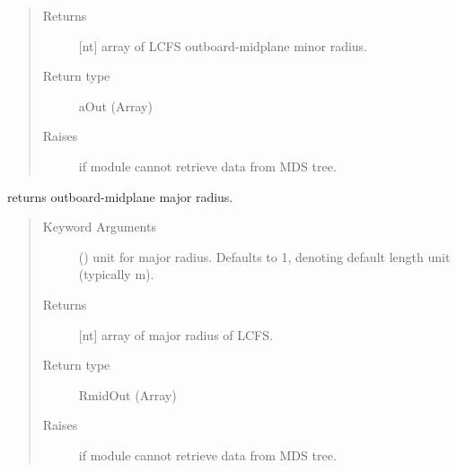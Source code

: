 \documentclass[letterpaper,10pt,english]{sphinxmanual}
\begin{document}
\begin{fulllineitems}
\begin{fulllineitems}
\begin{quote}
\begin{description}
\item[{Returns}] \leavevmode
{[}nt{]} array of LCFS outboard-midplane minor radius.

\item[{Return type}] \leavevmode
aOut (Array)

\item[{Raises}] \leavevmode
{} \textendash{} if module cannot retrieve data from MDS tree.

\end{description}\end{quote}

\end{fulllineitems}


\begin{fulllineitems}
\label{\detokenize{eqtools:eqtools.EFIT.EFITTree.getRmidOut}}
returns outboard-midplane major radius.
\begin{quote}\begin{description}
\item[{Keyword Arguments}] \leavevmode
{} () \textendash{} unit for major radius.  Defaults to 1,
denoting default length unit (typically m).

\item[{Returns}] \leavevmode
{[}nt{]} array of major radius of LCFS.

\item[{Return type}] \leavevmode
RmidOut (Array)

\item[{Raises}] \leavevmode
{} \textendash{} if module cannot retrieve data from MDS tree.

\end{description}\end{quote}

\end{fulllineitems}



\end{fulllineitems}
\end{document}
